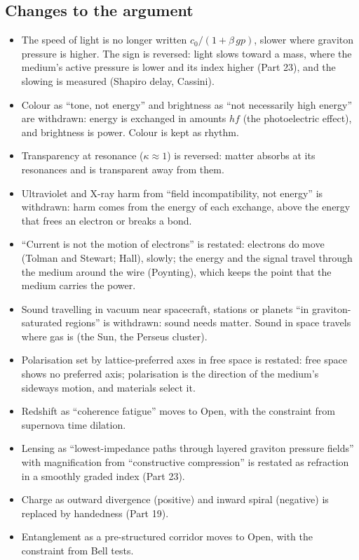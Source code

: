 \documentclass[11pt,a4paper]{article}
\begin{document}
\subsection*{Changes to the argument}
\begin{itemize}
\item The speed of light is no longer written $c_0/(1+\beta\,gp)$, slower where graviton pressure is higher. The sign is reversed: light slows toward a mass, where the medium's active pressure is lower and its index higher (Part 23), and the slowing is measured (Shapiro delay, Cassini).
\item Colour as ``tone, not energy'' and brightness as ``not necessarily high energy'' are withdrawn: energy is exchanged in amounts $hf$ (the photoelectric effect), and brightness is power. Colour is kept as rhythm.
\item Transparency at resonance ($\kappa \approx 1$) is reversed: matter absorbs at its resonances and is transparent away from them.
\item Ultraviolet and X-ray harm from ``field incompatibility, not energy'' is withdrawn: harm comes from the energy of each exchange, above the energy that frees an electron or breaks a bond.
\item ``Current is not the motion of electrons'' is restated: electrons do move (Tolman and Stewart; Hall), slowly; the energy and the signal travel through the medium around the wire (Poynting), which keeps the point that the medium carries the power.
\item Sound travelling in vacuum near spacecraft, stations or planets ``in graviton-saturated regions'' is withdrawn: sound needs matter. Sound in space travels where gas is (the Sun, the Perseus cluster).
\item Polarisation set by lattice-preferred axes in free space is restated: free space shows no preferred axis; polarisation is the direction of the medium's sideways motion, and materials select it.
\item Redshift as ``coherence fatigue'' moves to Open, with the constraint from supernova time dilation.
\item Lensing as ``lowest-impedance paths through layered graviton pressure fields'' with magnification from ``constructive compression'' is restated as refraction in a smoothly graded index (Part 23).
\item Charge as outward divergence (positive) and inward spiral (negative) is replaced by handedness (Part 19).
\item Entanglement as a pre-structured corridor moves to Open, with the constraint from Bell tests.

\end{itemize}
\end{document}
